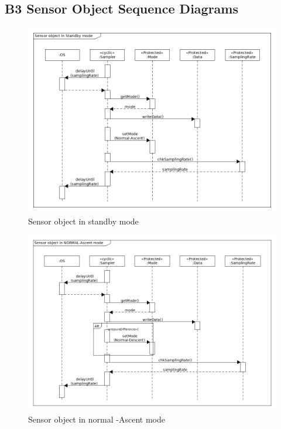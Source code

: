 \subsection*{B3 Sensor Object Sequence Diagrams}
\begin{figure}[H]
    \centering
    \includegraphics[height=0.9\textwidth, angle=270]{appendix/img/sensor-seq-dia-a.png}
    \caption{Sensor object in standby mode}
    \label{sensora}
\end{figure}
\begin{figure}[H]
    \centering
    \includegraphics[height=0.9\textwidth, angle=270]{appendix/img/sensor-seq-dia-b.png}
    \caption{Sensor object in normal -Ascent mode}
    \label{sensorb}
\end{figure}

